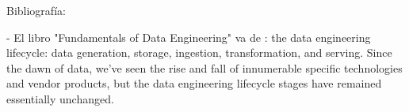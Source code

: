 \documentclass[12pt]{book}
\begin{document}


Bibliografía: 

- El libro "Fundamentals of Data Engineering" va de : the data engineering lifecycle: data generation, storage, ingestion, transformation, and serving. Since the dawn of data, we've seen the rise and fall of innumerable specific technologies and vendor products, but the data engineering lifecycle stages have remained essentially unchanged. 
\end{document}
